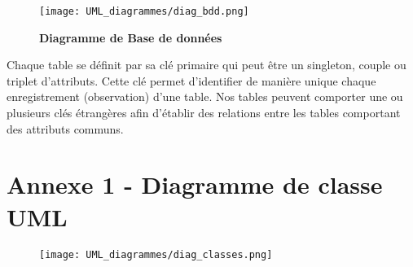 \documentclass[11pt]{article}
\begin{document}
\begin{figure}[H]
    \caption{\textbf{Diagramme de Base de données}}
    \label{UML_bdd}
    \centering
    \texttt{[image: UML\_diagrammes/diag\_bdd.png]}
\end{figure}


Chaque table se définit par sa clé primaire qui peut être un singleton, couple ou triplet d'attributs. Cette clé permet d'identifier de manière unique chaque enregistrement (observation) d'une table. Nos tables peuvent comporter une ou plusieurs clés étrangères afin d'établir des relations entre les tables comportant des attributs communs.










\appendix  %
\section*{Annexe 1 - Diagramme de classe UML}

\begin{figure}[H]
    \label{UML_classes}
    \centering
    \texttt{[image: UML\_diagrammes/diag\_classes.png]}
\end{figure}



\restoregeometry
\end{document}
